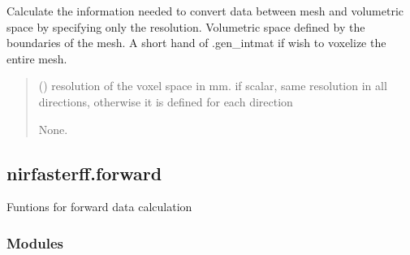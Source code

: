 \documentclass[letterpaper,10pt,english]{sphinxmanual}
\begin{document}
\begin{fulllineitems}
\begin{fulllineitems}
\end{fulllineitems}


\begin{fulllineitems}
\label{\detokenize{_autosummary/nirfasterff.base.stnd_mesh.stndmesh:nirfasterff.base.stnd_mesh.stndmesh.voxelize}}
\pysigstartsignatures
\pysiglinewithargsret
{}
{}
{}
\pysigstopsignatures
\sphinxAtStartPar
Calculate the information needed to convert data between mesh and volumetric space by specifying only the resolution.
Volumetric space defined by the boundaries of the mesh. A short hand of .gen\_intmat if wish to voxelize the entire mesh.
\begin{quote}\begin{description}
\sphinxAtStartPar
{} () \textendash{} resolution of the voxel space in mm.
if scalar, same resolution in all directions, otherwise it is defined for each direction

\sphinxAtStartPar
None.

\end{description}\end{quote}

\end{fulllineitems}


\end{fulllineitems}


\sphinxstepscope


\subsection{nirfasterff.forward}
\label{\detokenize{_autosummary/nirfasterff.forward:module-nirfasterff.forward}}\label{\detokenize{_autosummary/nirfasterff.forward:nirfasterff-forward}}\label{\detokenize{_autosummary/nirfasterff.forward::doc}}
\sphinxAtStartPar
Funtions for forward data calculation
\subsubsection*{Modules}
\end{document}
